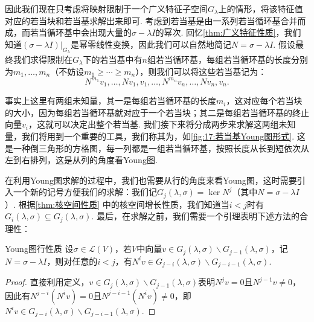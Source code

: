 因此我们现在只考虑将映射限制于一个广义特征子空间$G_\lambda$上的情形，将该特征值对应的若当块和若当基求解出来即可. 考虑到若当基是由一系列若当循环基合并而成，而若当循环基中会出现大量的$\sigma-\lambda I$的幂次. 回忆\autoref{thm:广义特征性质}，我们知道$(\sigma-\lambda I)\vert_{G_\lambda}$是幂零线性变换，因此我们可以自然地简记$N=\sigma-\lambda I$. 假设最终我们求得限制在$G_\lambda$下的若当基中有$n$组若当循环基，每组若当循环基的长度分别为$m_1,\ldots,m_n$（不妨设$m_1\geqslant\cdots\geqslant m_n$），则我们可以将这些若当基记为：
\[N^{m_1}v_1,\ldots,Nv_1,v_1,\ldots,N^{m_n}v_n,\ldots,Nv_n,v_n.\]

事实上这里有两组未知量，其一是每组若当循环基的长度$m_i$，这对应每个若当块的大小，因为每组若当循环基就对应于一个若当块；其二是每组若当循环基的终止向量$v_i$，这就可以决定出整个若当基. 我们接下来将分成两步来求解这两组未知量，我们将用到一个重要的工具，我们称其为，如\autoref{fig:17:若当基Young图形式}. 这是一种倒三角形的方格图，每一列都是一组若当循环基，按照长度从长到短依次从左到右排列，这是从列的角度看Young图.

在利用Young图求解的过程中，我们也需要从行的角度来看Young图，这时需要引入一个新的记号方便我们的求解：我们记$G_j(\lambda,\sigma)=\ker N^j$（其中$N=\sigma-\lambda I$）. 根据\autoref{thm:核空间性质} 中的核空间增长性质，我们知道当$i<j$时有$G_i(\lambda,\sigma)\subseteq G_j(\lambda,\sigma)$. 最后，在求解之前，我们需要一个引理表明下述方法的合理性：
\begin{lemma}{}{Young图行性质}
    设$\sigma\in \mathcal{L}(V)$，若$V$中向量$v\in G_j(\lambda,\sigma)\backslash G_{j-1}(\lambda,\sigma)$，记$N=\sigma-\lambda I$，则对任意的$i<j$，有$N^iv\in G_{j-i}(\lambda,\sigma)\backslash G_{j-i-1}(\lambda,\sigma)$.
\end{lemma}

\begin{proof}

    直接利用定义，$v\in G_j(\lambda,\sigma)\backslash G_{j-1}(\lambda,\sigma)$表明$N^jv=0$且$N^{j-1}v\neq 0$，因此有$N^{j-i}(N^iv)=0$且$N^{j-i-1}(N^iv)\neq 0$，即$N^iv\in G_{j-i}(\lambda,\sigma)\backslash G_{j-i-1}(\lambda,\sigma)$.
\end{proof}

